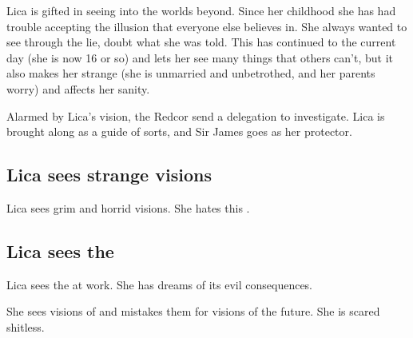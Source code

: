 Lica is gifted in seeing into the worlds beyond. Since her childhood she has had trouble accepting the illusion that everyone else believes in. She always wanted to see through the lie, doubt what she was told. This has continued to the current day (she is now 16 or so) and lets her see many things that others can't, but it also makes her strange (she is unmarried and unbetrothed, and her parents worry) and affects her sanity. 

Alarmed by Lica's vision, the Redcor send a delegation to investigate. Lica is brought along as a guide of sorts, and Sir James goes as her protector. 









\subsection{Lica sees strange visions}
Lica sees grim and horrid visions. 
She hates this . 










\subsection{Lica sees the \Morbus}
Lica sees the  at work. 
She has dreams of its evil consequences. 

She sees visions of \Nyx{} and mistakes them for visions of the future. 
She is scared shitless. 

